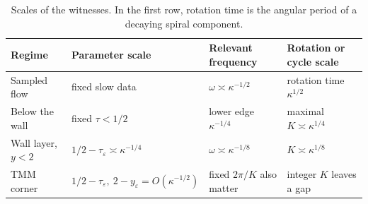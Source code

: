 \documentclass[11pt]{article}
\theoremstyle{definition}
\theoremstyle{remark}
\begin{document}
\begin{table}[t]
\centering\small
\begin{tabular}{@{}p{}p{}p{}p{}@{}}
\toprule
Regime & Parameter scale & Relevant frequency & Rotation or cycle scale\\
\midrule
Sampled flow & fixed slow data & \(\omega\asymp\kappa^{-1/2}\) & rotation time \(\kappa^{1/2}\)\\
Below the wall & fixed \(\tau<1/2\) & lower edge \(\kappa^{-1/4}\) & maximal \(K\asymp\kappa^{1/4}\)\\
Wall layer, \(y<2\) & \(1/2-\tau_\varepsilon\asymp\kappa^{-1/4}\) & \(\omega\asymp\kappa^{-1/8}\) & \(K\asymp\kappa^{1/8}\)\\
TMM corner & \(1/2-\tau_\varepsilon,\ 2-y_\varepsilon=O(\kappa^{-1/2})\) & fixed \(2\pi/K\) also matter & integer \(K\) leaves a gap\\
\bottomrule
\end{tabular}
\caption{Scales of the witnesses.  In the first row, rotation time is the angular period of a decaying spiral component.}
\label{tab:scales}
\end{table}
\end{document}
